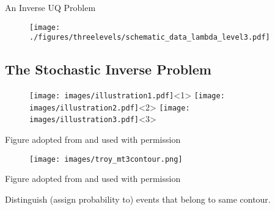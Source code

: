 \begin{frame}{An Inverse UQ Problem}

\begin{figure}[h]
	\texttt{[image: ./figures/threelevels/schematic\_data\_lambda\_level3.pdf]}
\end{figure}


\end{frame}



\subsection{The Stochastic Inverse Problem}
\begin{frame}[t]

\begin{figure}
\centering
	\texttt{[image: images/illustration1.pdf]}<1>
	\texttt{[image: images/illustration2.pdf]}<2>
	\texttt{[image: images/illustration3.pdf]}<3>
\end{figure}
\begin{center}
{\scriptsize Figure adopted from \cite{BET14+} and used with permission}
\end{center}
\end{frame}

\begin{frame}[t]

\begin{figure}
\centering
	\texttt{[image: images/troy\_mt3contour.png]}
\end{figure}
\begin{center}

{\scriptsize Figure adopted from \cite{BET14+} and used with permission}

 Distinguish (assign probability to) events that belong to same contour.
\end{center}
\end{frame}
